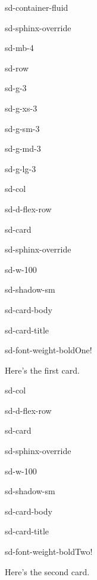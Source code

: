 \documentclass[letterpaper,10pt,english]{jupyterBook}
\begin{document}
\begin{sphinxuseclass}{sd-container-fluid}
\begin{sphinxuseclass}{sd-sphinx-override}
\begin{sphinxuseclass}{sd-mb-4}
\begin{sphinxuseclass}{sd-row}
\begin{sphinxuseclass}{sd-g-3}
\begin{sphinxuseclass}{sd-g-xs-3}
\begin{sphinxuseclass}{sd-g-sm-3}
\begin{sphinxuseclass}{sd-g-md-3}
\begin{sphinxuseclass}{sd-g-lg-3}
\begin{sphinxuseclass}{sd-col}
\begin{sphinxuseclass}{sd-d-flex-row}
\begin{sphinxuseclass}{sd-card}
\begin{sphinxuseclass}{sd-sphinx-override}
\begin{sphinxuseclass}{sd-w-100}
\begin{sphinxuseclass}{sd-shadow-sm}
\begin{sphinxuseclass}{sd-card-body}
\begin{sphinxuseclass}{sd-card-title}
\begin{sphinxuseclass}{sd-font-weight-bold}One!
\end{sphinxuseclass}
\end{sphinxuseclass}
\sphinxAtStartPar
Here’s the first card.

\end{sphinxuseclass}
\end{sphinxuseclass}
\end{sphinxuseclass}
\end{sphinxuseclass}
\end{sphinxuseclass}
\end{sphinxuseclass}
\end{sphinxuseclass}
\begin{sphinxuseclass}{sd-col}
\begin{sphinxuseclass}{sd-d-flex-row}
\begin{sphinxuseclass}{sd-card}
\begin{sphinxuseclass}{sd-sphinx-override}
\begin{sphinxuseclass}{sd-w-100}
\begin{sphinxuseclass}{sd-shadow-sm}
\begin{sphinxuseclass}{sd-card-body}
\begin{sphinxuseclass}{sd-card-title}
\begin{sphinxuseclass}{sd-font-weight-bold}Two!
\end{sphinxuseclass}
\end{sphinxuseclass}
\sphinxAtStartPar
Here’s the second card.


\end{sphinxuseclass}
\end{sphinxuseclass}
\end{sphinxuseclass}
\end{sphinxuseclass}
\end{sphinxuseclass}
\end{sphinxuseclass}
\end{sphinxuseclass}
\end{sphinxuseclass}
\end{sphinxuseclass}
\end{sphinxuseclass}
\end{sphinxuseclass}
\end{sphinxuseclass}
\end{sphinxuseclass}
\end{sphinxuseclass}
\end{sphinxuseclass}
\end{sphinxuseclass}
\end{document}
